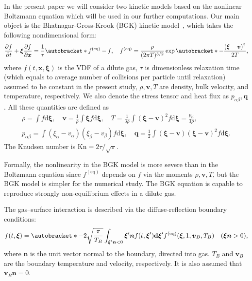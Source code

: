 \documentclass[]{elsarticle} %
\newcommand{\Kn}{\mathrm{Kn}}
\newcommand{\dd}{\mathrm{d}}
\newcommand{\pder}[2][]{\frac{\partial#1}{\partial#2}}
\DeclarePairedDelimiter\autobracket()       %
\newcommand{\br}[1]{\autobracket*{#1}}
\newcommand{\dxi}{\boldsymbol{\dd\xi}}
\newcommand{\bxi}{\boldsymbol{\xi}}
\newcommand{\bv}{\boldsymbol{v}}
\newcommand{\bq}{\boldsymbol{q}}
\newcommand{\bn}{\boldsymbol{n}}
\newcommand{\bx}{\boldsymbol{x}}
\newcommand{\equil}[1]{#1^\mathrm{(eq)}}
\begin{document}
{%
In the present paper we will consider two kinetic models based on the nonlinear Boltzmann equation which will be used in our further computations.
Our main object is the Bhatnagar-Gross-Krook (BGK) kinetic model~\cite{Krook1954, Welander1954},
which takes the following nondimensional form:
\begin{equation}\label{eq:bgk}
    \pder[f]{t} + \bxi\pder[f]{\bx} = \frac1\tau\br{\equil{f}-f}, \quad
    \equil{f} = \frac{\rho}{(2\pi T)^{3/2}}\exp\br{ -\frac{(\bxi-\bv)^2}{2T} },
\end{equation}
where $f(t,\bx,\bxi)$ is the VDF of a dilute gas, $\tau$ is dimensionless relaxation time
(which equals to average number of collisions per particle until relaxation)
assumed to be constant in the present study, $\rho,\bv,T$ are density, bulk velocity, and temperature, respectively.
We also denote the stress tensor and heat flux as $p_{\alpha \beta}, \bq$.
All these quantities are defined as
\begin{equation}\label{eq:macro}
    \begin{gathered}
    \rho = \int f \dxi, \quad
    \bv = \frac1{\rho} \int \bxi f \dxi, \quad
    T = \frac{1}{3\rho}\int(\bxi-\bv)^2f \dxi = \frac{p_{ii}}{3\rho}, \\
    p_{\alpha \beta} = \int(\xi_{\alpha}-v_{\alpha})(\xi_{\beta}-v_{\beta}) f \dxi, \quad
    \bq = \frac{1}{2}\int(\bxi-\bv)(\bxi-\bv)^2 f \dxi.
    \end{gathered}
\end{equation}
The Knudsen number is \(\Kn = 2\tau/\sqrt\pi\).

Formally, the nonlinearity in the BGK model is more severe than in the Boltzmann equation since $\equil{f}$ depends on $f$
via the moments $\rho,\bv,T$, but the BGK model is simpler for the numerical study.
The BGK equation is capable to reproduce strongly non-equilibrium effects in a dilute gas.

The gas--surface interaction is described via the diffuse-reflection boundary conditions:
\begin{equation}\label{eq:diffuse}
    f(t,\bxi) = \br{-2\sqrt\frac\pi{T_B} \int_{\bxi'\bn<0}\bxi'\bn f(t,\bxi')\dxi'}
        \equil{f}(\bxi,1,\bv_B,T_B) \quad (\bxi\bn>0),
\end{equation}
where \(\bn\) is the unit vector normal to the boundary, directed into gas.
\(T_B\) and \(\bv_B\) are the boundary temperature and velocity, respectively.
It is also assumed that \(\bv_B\bn = 0\).

}
\end{document}
